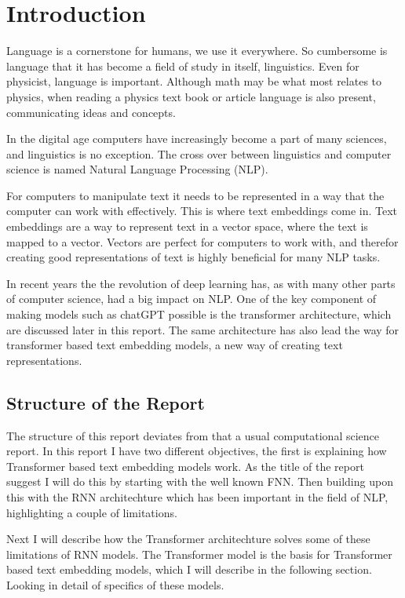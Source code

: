 
\section{Introduction}\label{sec:Introduction}
Language is a cornerstone for humans, we use it everywhere. 
So cumbersome is language that it has become a field of study in itself, linguistics.
Even for physicist, language is important. Although math may be 
what most relates to physics, when reading a physics text book or 
article language is also present, communicating ideas and concepts.

In the digital age computers have increasingly become a part of many sciences, and linguistics is no exception.
The cross over between linguistics and computer science is named Natural Language Processing (NLP). 

For computers to manipulate text it needs to be represented in a way that the computer can work with effectively.
This is where text embeddings come in. Text embeddings are a way to represent text in a vector space, 
where the text is mapped to a vector. Vectors are perfect for computers to work with,
and therefor creating good representations of text is highly beneficial 
for many NLP tasks.

In recent years the the revolution of deep learning has, as with many 
other parts of computer science, had a big impact on NLP. 
One of the key component of making models such as chatGPT 
possible is the transformer architecture, which are discussed later 
in this report. The same architecture has also lead the way for 
transformer based text embedding models, a new way of creating text representations.


\subsection{Structure of the Report}
The structure of this report deviates from that a usual computational science report.
In this report I have two different objectives, the first is explaining how 
Transformer based text embedding models work. As the title of the report
suggest I will do this by starting with the well known FNN. Then building
upon this with the RNN architechture which has been important in the field of
NLP, highlighting a couple of limitations. 

Next I will describe how the Transformer architechture solves some of these limitations
of RNN models. The Transformer model is the basis for Transformer based text embedding models,
which I will describe in the following section. Looking in detail of 
specifics of these models.


